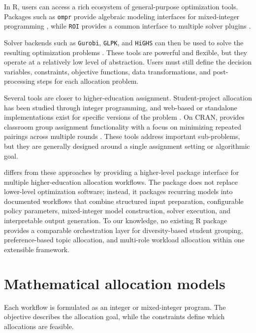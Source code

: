 In R, users can access a rich ecosystem of general-purpose optimization tools.
Packages such as \texttt{ompr} provide algebraic modeling interfaces for mixed-integer
programming \citep{R-ompr}, while \texttt{ROI} provides a common interface to multiple
solver plugins \citep{R-ROI, R-ompr-roi}.

Solver backends such as \texttt{Gurobi}, \texttt{GLPK}, and \texttt{HiGHS} can then be used to solve the
resulting optimization problems \citep{gurobi_manual, glpk_manual, highs_manual}.
These tools are powerful and flexible, but they operate at a relatively low
level of abstraction. Users must still define the decision variables,
constraints, objective functions, data transformations, and post-processing
steps for each allocation problem.

Several tools are closer to higher-education assignment. Student-project allocation
has been studied through integer programming, and web-based or standalone
implementations exist for specific versions of the problem
\citep{anwar2003student, meyer2009optassign}. On CRAN,  provides classroom
group assignment functionality with a focus on minimizing repeated pairings
across multiple rounds \citep{R-golfr}. These tools address important sub-problems,
but they are generally designed around a single assignment setting or
algorithmic goal.

 differs from these approaches by providing a higher-level package
interface for multiple higher-education allocation workflows. The package does
not replace lower-level optimization software; instead, it packages recurring
models into documented workflows that combine structured input preparation,
configurable policy parameters, mixed-integer model construction, solver
execution, and interpretable output generation. To our knowledge, no existing R
package provides a comparable orchestration layer for diversity-based student
grouping, preference-based topic allocation, and multi-role workload allocation
within one extensible framework.

\section{Mathematical allocation models}\label{sec-math-models}

Each  workflow is formulated as an integer or mixed-integer program.
The objective describes the allocation goal, while the constraints define which
allocations are feasible.

